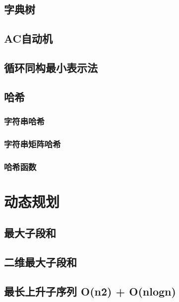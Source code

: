 \documentclass[a4paper, 12pt, twoside]{article}
\begin{document}
\subsection{字典树}


\subsection{AC自动机}


\subsection{循环同构最小表示法}


\subsection{哈希}
\subsubsection{字符串哈希}

\subsubsection{字符串矩阵哈希}

\subsubsection{哈希函数}


\section{动态规划}
\subsection{最大子段和}

\subsection{二维最大子段和}

\subsection{最长上升子序列 O(n\^2) + O(nlogn)}

\end{document}
